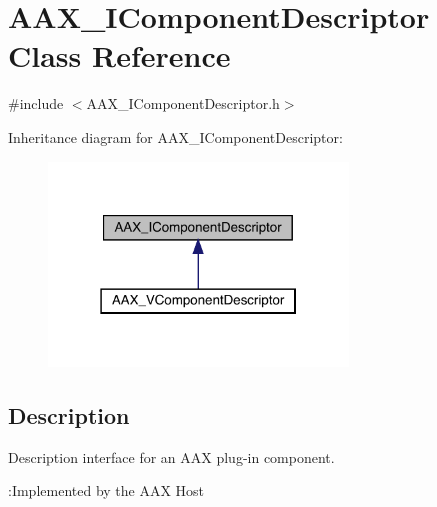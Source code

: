 \hypertarget{a01781}{}\section{A\+A\+X\+\_\+\+I\+Component\+Descriptor Class Reference}
\label{a01781}


{\ttfamily \#include $<$A\+A\+X\+\_\+\+I\+Component\+Descriptor.\+h$>$}



Inheritance diagram for A\+A\+X\+\_\+\+I\+Component\+Descriptor\+:
\nopagebreak
\begin{figure}[H]
\begin{center}
\leavevmode
\includegraphics[width=226pt]{a01780}
\end{center}
\end{figure}


\subsection{Description}
Description interface for an A\+AX plug-\/in component. 

\begin{DoxyRefDesc}{\+:\+Implemented by the A\+A\+X Host}
\item[\mbox{\hyperlink{a00790__aax_host_implementation000003}{\+:\+Implemented by the A\+A\+X Host}}]\end{DoxyRefDesc}


